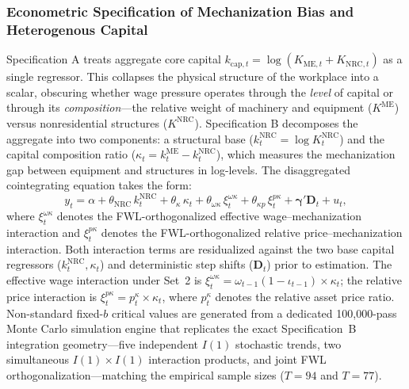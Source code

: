 \subsubsection{Econometric Specification of Mechanization Bias and Heterogenous Capital}
Specification A treats aggregate core capital $k_{\text{cap},t} = \log(K_{\text{ME},t} + K_{\text{NRC},t})$ as a single regressor. This collapses the physical structure of the workplace into a scalar, obscuring whether wage pressure operates through the \emph{level} of capital or through its \emph{composition}---the relative weight of machinery and equipment ($K^{\text{ME}}$) versus nonresidential structures ($K^{\text{NRC}}$). Specification B decomposes the aggregate into two components: a structural base ($k^{\text{NRC}}_t = \log K^{\text{NRC}}_t$) and the capital composition ratio ($\kappa_t = k^{\text{ME}}_t - k^{\text{NRC}}_t$), which measures the mechanization gap between equipment and structures in log-levels. The disaggregated cointegrating equation takes the form:
\begin{equation}
	y_t = \alpha + \theta_{\text{NRC}}\, k^{\text{NRC}}_t + \theta_\kappa\, \kappa_t + \theta_{\omega\kappa}\, \xi^{\omega\kappa}_t + \theta_{\kappa p}\, \xi^{p\kappa}_t + \boldsymbol{\gamma}' \mathbf{D}_t + u_t,
	\label{eq:432:specB_model}
\end{equation}
where $\xi^{\omega\kappa}_t$ denotes the FWL-orthogonalized effective wage--mechanization interaction and $\xi^{p\kappa}_t$ denotes the FWL-orthogonalized relative price--mechanization interaction. Both interaction terms are residualized against the two base capital regressors ($k^{\text{NRC}}_t, \kappa_t$) and deterministic step shifts ($\mathbf{D}_t$) prior to estimation. The effective wage interaction under Set~2 is $\xi^{\omega\kappa}_t = \omega_{t-1}(1-\iota_{t-1}) \times \kappa_t$; the relative price interaction is $\xi^{p\kappa}_t = p^{\kappa}_t \times \kappa_t$, where $p^{\kappa}_t$ denotes the relative asset price ratio. Non-standard fixed-$b$ critical values are generated from a dedicated 100,000-pass Monte Carlo simulation engine that replicates the exact Specification~B integration geometry---five independent $I(1)$ stochastic trends, two simultaneous $I(1) \times I(1)$ interaction products, and joint FWL orthogonalization---matching the empirical sample sizes ($T = 94$ and $T = 77$).

